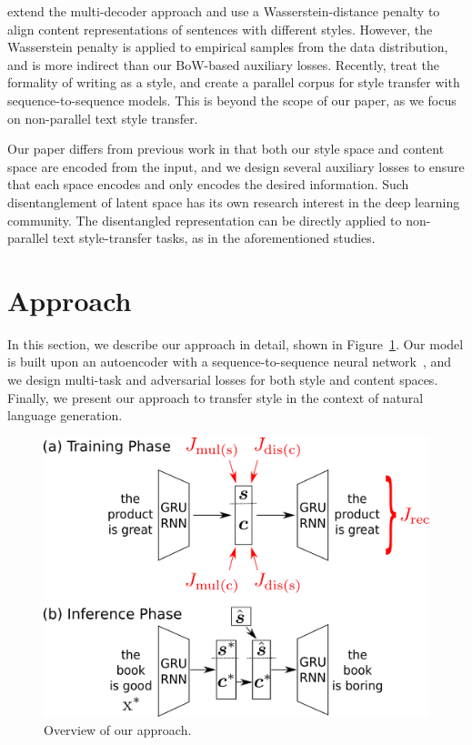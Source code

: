 \documentclass[letterpaper]{article} %
\begin{document}
\citet{zhao2018adversarially} extend the multi-decoder approach and use a Wasserstein-distance penalty to align content representations of sentences with different styles. However, the Wasserstein penalty is applied to  empirical samples from the data distribution, and is more indirect than our BoW-based auxiliary losses.
Recently, \citet{rao2018dear} treat the formality of writing as a style, and create a parallel corpus for style transfer with sequence-to-sequence models.
This is beyond the scope of our paper, as we focus on non-parallel text style transfer.

Our paper differs from previous work in that both our style space and content space are encoded from the input, and we design several auxiliary losses to ensure that each space encodes and only encodes the desired information.
Such disentanglement of latent space has its own research interest in the deep learning community.
The disentangled representation can be directly applied to non-parallel text style-transfer tasks, as in the aforementioned studies.


\section{Approach}

In this section, we describe our approach in detail, shown in Figure~\ref{fig:overview}.
Our model is built upon an autoencoder with a sequence-to-sequence neural network~\cite{sutskever2014sequence}, and we design multi-task and adversarial losses for both style and content spaces.
Finally, we present our approach to transfer style in the context of natural language generation.

\begin{figure}[!t]
	\centering
	\includegraphics[width=.9\linewidth]{model-overview}
	\caption{Overview of our approach.}
	\label{fig:overview}
\end{figure}
\end{document}
